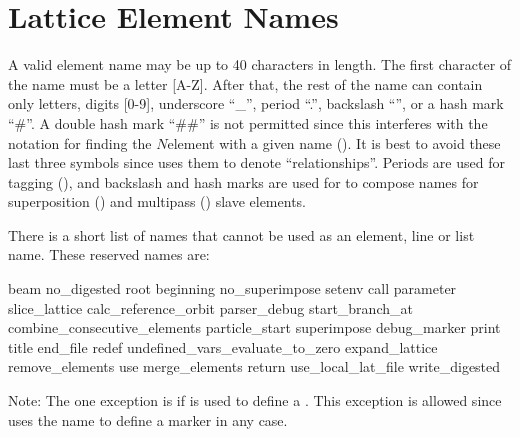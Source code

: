 \section{Lattice Element Names}
\label{s:ele.names}

A valid element name may be up to 40 characters in length. The first character of the name must be a
letter [A-Z]. After that, the rest of the name can contain only letters, digits [0-9], underscore
``_'', period ``.'', backslash ``\B'', or a hash mark ``\#''. A double hash mark ``\#\#'' is not
permitted since this interferes with the notation for finding the $N$\Th element with a given name
(). It is best to avoid these last three symbols since \bmad uses them to denote
``relationships''. Periods are used for tagging (), and backslash and hash marks are
used for to compose names for superposition () and multipass ()
slave elements.

There is a short list of names that cannot be used as an element, line or list name. These reserved names are:
\begin{example}
  beam                             no_digested                  root
  beginning                        no_superimpose               setenv
  call                             parameter                    slice_lattice
  calc_reference_orbit             parser_debug                 start_branch_at
  combine_consecutive_elements     particle_start               superimpose
  debug_marker                     print                        title
  end_file                         redef                        undefined_vars_evaluate_to_zero 
  expand_lattice                   remove_elements              use
  merge_elements                   return                       use_local_lat_file
                                                                write_digested
\end{example}
Note: The one exception is if  is used to define a . This exception is allowed
since \bmad uses the  name to define a marker in any case.

